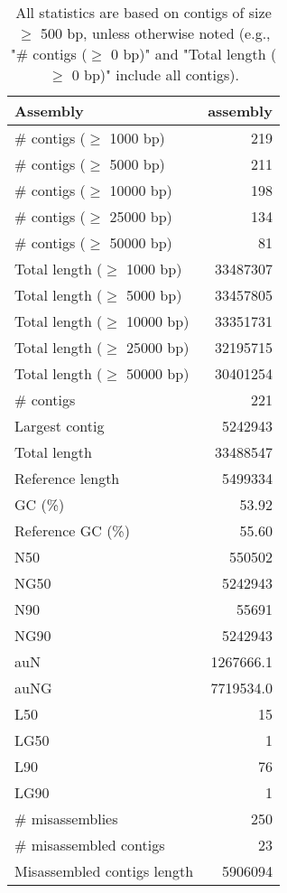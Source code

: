 \documentclass[12pt,a4paper]{article}
\begin{document}
\begin{table}[ht]
\begin{center}
\caption{All statistics are based on contigs of size $\geq$ 500 bp, unless otherwise noted (e.g., "\# contigs ($\geq$ 0 bp)" and "Total length ($\geq$ 0 bp)" include all contigs).}
\begin{tabular}{|l*{1}{|r}|}
\hline
Assembly & assembly \\ \hline
\# contigs ($\geq$ 1000 bp) & 219 \\ \hline
\# contigs ($\geq$ 5000 bp) & 211 \\ \hline
\# contigs ($\geq$ 10000 bp) & 198 \\ \hline
\# contigs ($\geq$ 25000 bp) & 134 \\ \hline
\# contigs ($\geq$ 50000 bp) & 81 \\ \hline
Total length ($\geq$ 1000 bp) & 33487307 \\ \hline
Total length ($\geq$ 5000 bp) & 33457805 \\ \hline
Total length ($\geq$ 10000 bp) & 33351731 \\ \hline
Total length ($\geq$ 25000 bp) & 32195715 \\ \hline
Total length ($\geq$ 50000 bp) & 30401254 \\ \hline
\# contigs & 221 \\ \hline
Largest contig & 5242943 \\ \hline
Total length & 33488547 \\ \hline
Reference length & 5499334 \\ \hline
GC (\%) & 53.92 \\ \hline
Reference GC (\%) & 55.60 \\ \hline
N50 & 550502 \\ \hline
NG50 & 5242943 \\ \hline
N90 & 55691 \\ \hline
NG90 & 5242943 \\ \hline
auN & 1267666.1 \\ \hline
auNG & 7719534.0 \\ \hline
L50 & 15 \\ \hline
LG50 & 1 \\ \hline
L90 & 76 \\ \hline
LG90 & 1 \\ \hline
\# misassemblies & 250 \\ \hline
\# misassembled contigs & 23 \\ \hline
Misassembled contigs length & 5906094 \\ \hline

\end{tabular}
\end{center}
\end{table}
\end{document}
